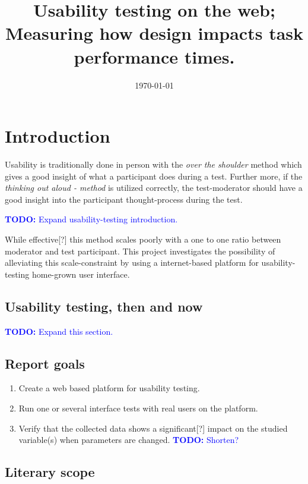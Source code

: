 \documentclass[nofilelist]{cslthse-msc}
\title{
  Usability testing on the web; Measuring how design impacts task performance
  times.
}
\date{\today}
\begin{document}
\renewcommand{\bibname}{References}

\makefrontmatter
\newcommand{\todo}[1]{\textcolor{blue}{\textbf{TODO:} #1}}
\newcommand{\eatdot}[1]{}
\newcommand{\ctitle}[1]{\citetitle{#1}\cite{#1}}

\chapter{Introduction}

	Usability is traditionally done in person with the
	\textit{over the shoulder} method which gives a good insight of what a
	participant does during a test. Further more, if the
	\textit{thinking out aloud - method} is utilized correctly, the
	test-moderator should have a good insight into the participant
	thought-process during the test.

	\todo{Expand usability-testing introduction.}

	While effective[?] this method scales poorly with a one to one ratio between
	moderator and test participant. This project investigates the possibility of
	alleviating this scale-constraint by using a internet-based platform for
	usability-testing home-grown user interface.

	\section{Usability testing, then and now}

		\todo{Expand this section.}

	\section{Report goals}

		\begin{enumerate}
			\item{Create a web based platform for usability testing.}
			\item{Run one or several interface tests with real users on the platform.}
			\item{
				Verify that the collected data shows a significant[?] impact on the studied
				variable(s) when parameters are changed. \todo{Shorten?}
			}
		\end{enumerate}

	\section{Literary scope}
\end{document}
